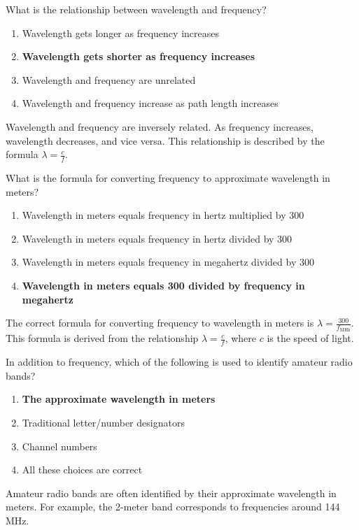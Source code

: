 
\begin{tcolorbox}[colback=gray!10!white,colframe=black!75!black,title={T3B05}]
    What is the relationship between wavelength and frequency?
    \begin{enumerate}[label=\Alph*),noitemsep]
        \item Wavelength gets longer as frequency increases
        \item \textbf{Wavelength gets shorter as frequency increases}
        \item Wavelength and frequency are unrelated
        \item Wavelength and frequency increase as path length increases
    \end{enumerate}
\end{tcolorbox}
Wavelength and frequency are inversely related. As frequency increases, wavelength decreases, and vice versa. This relationship is described by the formula $\lambda = \frac{c}{f}$.


\begin{tcolorbox}[colback=gray!10!white,colframe=black!75!black,title={T3B06}]
    What is the formula for converting frequency to approximate wavelength in meters?
    \begin{enumerate}[label=\Alph*),noitemsep]
        \item Wavelength in meters equals frequency in hertz multiplied by 300
        \item Wavelength in meters equals frequency in hertz divided by 300
        \item Wavelength in meters equals frequency in megahertz divided by 300
        \item \textbf{Wavelength in meters equals 300 divided by frequency in megahertz}
    \end{enumerate}
\end{tcolorbox}
The correct formula for converting frequency to wavelength in meters is $\lambda = \frac{300}{f_{\text{MHz}}}$. This formula is derived from the relationship $\lambda = \frac{c}{f}$, where $c$ is the speed of light.


\begin{tcolorbox}[colback=gray!10!white,colframe=black!75!black,title={T3B07}]
    In addition to frequency, which of the following is used to identify amateur radio bands?
    \begin{enumerate}[label=\Alph*),noitemsep]
        \item \textbf{The approximate wavelength in meters}
        \item Traditional letter/number designators
        \item Channel numbers
        \item All these choices are correct
    \end{enumerate}
\end{tcolorbox}
Amateur radio bands are often identified by their approximate wavelength in meters. For example, the 2-meter band corresponds to frequencies around 144 MHz.

